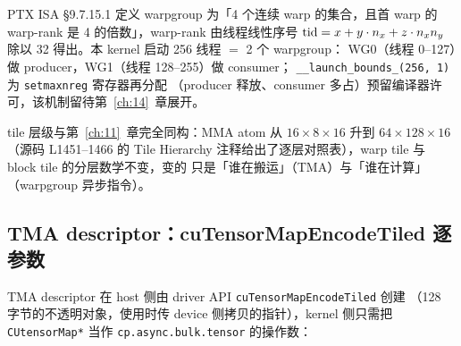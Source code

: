 PTX ISA §9.7.15.1 定义 warpgroup 为「4 个连续 warp 的集合，且首 warp 的 warp-rank
是 4 的倍数」，warp-rank 由线程线性序号 $\mathrm{tid} = x + y \cdot n\sb{x} +
z \cdot n\sb{x} n\sb{y}$ 除以 32 得出。本 kernel 启动 256 线程 $=$ 2 个 warpgroup：
WG0（线程 0--127）做 producer，WG1（线程 128--255）做 consumer；
\texttt{\_\allowbreak{}\_\allowbreak{}launch\_\allowbreak{}bounds\_\allowbreak{}(256,\allowbreak{} 1)} 为 \texttt{setmaxnreg} 寄存器再分配
（producer 释放、consumer 多占）预留编译器许可，该机制留待第~\ref{ch:14}~章展开。



tile 层级与第~\ref{ch:11}~章完全同构：MMA atom 从
$16 \times 8 \times 16$ 升到 $64 \times 128 \times 16$（源码 L1451--1466 的 Tile
Hierarchy 注释给出了逐层对照表），warp tile 与 block tile 的分层数学不变，变的
只是「谁在搬运」（TMA）与「谁在计算」（warpgroup 异步指令）。

\subsection{TMA descriptor：cuTensorMapEncodeTiled 逐参数}

TMA descriptor 在 host 侧由 driver API \texttt{cu\allowbreak{}Tensor\allowbreak{}Map\allowbreak{}Encode\allowbreak{}Tiled} 创建
（128 字节的不透明对象，使用时传 device 侧拷贝的指针），kernel 侧只需把
\texttt{CUtensor\allowbreak{}Map*} 当作 \texttt{cp.\allowbreak{}async.\allowbreak{}bulk.\allowbreak{}tensor} 的操作数：



